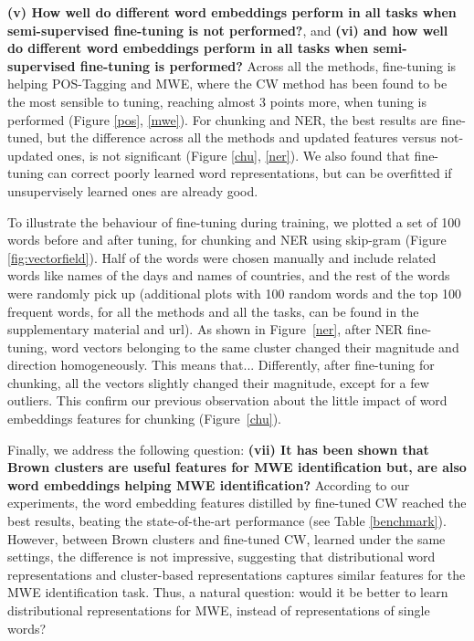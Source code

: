 
\textbf{(v) How well do different word embeddings perform in all tasks when semi-supervised fine-tuning is not performed?}, and 
\textbf{(vi) and how well do different word embeddings perform in all tasks when semi-supervised fine-tuning is performed?}
Across all the methods, fine-tuning is helping POS-Tagging and MWE, where the CW method has been found to be the most sensible to tuning, reaching almost 3 points more, when tuning is performed (Figure \ref{pos}, \ref{mwe}). 
For chunking and NER, the best results are fine-tuned, but the difference across all the methods and updated features versus not-updated ones, is not significant (Figure \ref{chu}, \ref{ner}). 
We also found that fine-tuning can correct poorly learned word representations, but can be
overfitted if unsupervisely learned ones are already good. 

To illustrate the behaviour of fine-tuning during training, we plotted a set of 100 words before and after tuning, for chunking and NER using skip-gram (Figure \ref{fig:vectorfield}). 
Half of the words were chosen manually and include related words like names of the days and names of countries, and the rest of the words were randomly pick up (additional plots with 100 random words and the top 100 frequent words, for all the methods and all the tasks, can be found in the supplementary material and {\color{red} url}).
As shown in Figure~\ref{ner}, after NER fine-tuning, word vectors belonging to the same cluster changed their magnitude and direction homogeneously. {\color{red} This means that...}
Differently, after fine-tuning for chunking, all the vectors slightly changed their magnitude, except for a few outliers. This confirm our previous observation about the little impact of word embeddings features for chunking (Figure~\ref{chu}). 

Finally, we address the following question: \textbf{(vii) It has been shown that Brown clusters are useful features for MWE identification but, are also word embeddings helping MWE identification?} 
According to our experiments, the word embedding features distilled by fine-tuned CW reached the best results, beating the state-of-the-art performance (see Table \ref{benchmark}).
However, between Brown clusters and fine-tuned CW, learned under the same settings, the difference is not impressive, suggesting that distributional word representations and cluster-based representations captures similar features for the MWE identification task.
Thus, a natural question: would it be better to learn distributional representations for MWE, instead of representations of single words?



